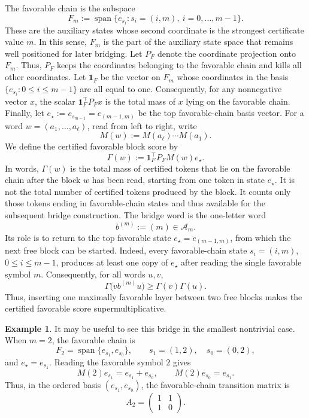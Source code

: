 \documentclass[11pt]{amsart}
\numberwithin{equation}{section}
\theoremstyle{plain}
\theoremstyle{definition}
\newtheorem{example}{Example}[section]
\theoremstyle{remark}
\begin{document}
The favorable chain is the subspace
\[
F_m
:=
\operatorname{span}\{e_{s_i}:s_i=(i,m),\ i=0,\dots,m-1\}.
\]
These are the auxiliary states whose second coordinate is the strongest
certificate value \(m\). In this sense, \(F_m\) is the part of the auxiliary
state space that remains well positioned for later bridging.
Let \(P_F\) denote the coordinate projection onto \(F_m\). Thus, \(P_F\) keeps
the coordinates belonging to the favorable chain and kills all other
coordinates. Let \(\mathbf 1_F\) be the vector on \(F_m\) whose coordinates in
the basis \(\{e_{s_i}:0\le i\le m-1\}\) are all equal to one. Consequently, for
any nonnegative vector \(x\), the scalar \(\mathbf 1_F^\top P_Fx\) is the total
mass of \(x\) lying on the favorable chain.
Finally, let
\(
e_\star:=e_{s_{m-1}}=e_{(m-1,m)}
\)
be the top favorable-chain basis vector. For a word
\(w=(a_1,\dots,a_\ell)\), read from left to right, write
\[
M(w):=M(a_\ell)\cdots M(a_1).
\]
We define the certified favorable block score by
\[
\Gamma(w):=\mathbf 1_F^\top P_FM(w)e_\star.
\]
In words, \(\Gamma(w)\) is the total mass of certified tokens that lie on the
favorable chain after the block \(w\) has been read, starting from one token in state \(e_\star\). It is not the total number of certified
tokens produced by the block. It counts only those tokens ending in
favorable-chain states and thus available for the subsequent bridge
construction.
The bridge word is the one-letter word
\[
b^{(m)}:=(m)\in\mathcal A_m.
\]
Its role is to return  to the top favorable state
\(e_\star=e_{(m-1,m)}\), from which the next free block can be started.
Indeed, every favorable-chain state \(s_i=(i,m)\), \(0\le i\le m-1\), produces at least one copy of \(e_\star\) after reading the single favorable symbol \(m\). Consequently, for all words \(u,v\),
\[
\Gamma\big(vb^{(m)}u\big)\ge \Gamma(v)\Gamma(u).
\]
Thus, inserting one maximally favorable layer between two free blocks makes the certified favorable score supermultiplicative.


\begin{example}
It may be useful to see this bridge in the smallest nontrivial case. When
\(m=2\), the favorable chain is
\[
F_2=\operatorname{span}\{e_{s_1},e_{s_0}\},
\qquad
s_1=(1,2),\quad s_0=(0,2),
\]
and \(e_\star=e_{s_1}\). Reading the favorable symbol \(2\) gives
\[
M(2)e_{s_1}=e_{s_1}+e_{s_0},
\qquad
M(2)e_{s_0}=e_{s_1}.
\]
Thus, in the ordered basis \((e_{s_1},e_{s_0})\), the favorable-chain transition matrix is
\[
A_2=
\begin{pmatrix}
1&1\\
1&0
\end{pmatrix}.
\]
\end{example}
\end{document}
